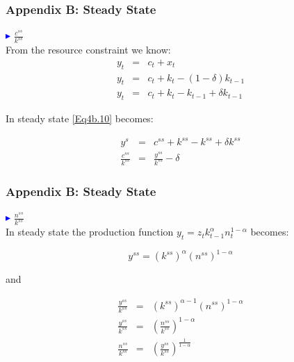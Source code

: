 \begin{frame}
\frametitle{Appendix B: Steady State} \vskip 0.1in

\textcolor{blue}{$\blacktriangleright$}  $\frac{c^{ss}}{k^{ss}}$\\

From the resource constraint we know:
\begin{eqnarray}
y_{t} &=& c_{t}+x_{t}\label{Eq4b.9}\\
y_{t} &=& c_{t}+k_{t} - (1-\delta)k_{t-1}\label{Eq4b.10}\\
y_{t} &=& c_{t}+k_{t} - k_{t-1}+\delta k_{t-1}\label{Eq4b.11}
\end{eqnarray}

In steady state \eqref{Eq4b.10} becomes:

\begin{eqnarray}
y^{s} &=& c^{ss}+k^{ss} - k^{ss}+\delta k^{ss} \label{Eq4b.12}\\
\frac{c^{ss}}{k^{ss}} &=& \frac{y^{ss}}{k^{ss}}-\delta
\label{Eq4b.13}
\end{eqnarray}

\end{frame}



\begin{frame}
\frametitle{Appendix B: Steady State} \vskip 0.1in

\textcolor{blue}{$\blacktriangleright$}  $\frac{n^{ss}}{k^{ss}}$\\

In steady state the production function
$y_{t}=z_{t}k_{t-1}^{\alpha}n_{t}^{1-\alpha}$ becomes:

\begin{equation}\label{Eq4b.14}
y^{ss}=(k^{ss})^{\alpha}(n^{ss})^{1-\alpha}
\end{equation}

and

\begin{eqnarray}
\frac{y^{ss}}{k^{ss}} &=& (k^{ss})^{\alpha-1} (n^{ss})^{1-\alpha}
\label{Eq4b.15}\\
\frac{y^{ss}}{k^{ss}} &=& (\frac{n^{ss}}{k^{ss}})^{1-\alpha}
\label{Eq4b.16}\\
\frac{n^{ss}}{k^{ss}} &=&
(\frac{y^{ss}}{k^{ss}})^{\frac{1}{1-\alpha}} \label{Eq4b.17}
\end{eqnarray}

\end{frame}


